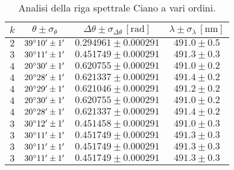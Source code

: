 \documentclass[]{article}
\begin{document}
    \begin{table}
        \centering
        \begin{tabular}{||c|c|c|c||}
            \hline
            $k$ & $\theta \pm \sigma_{\theta}$ & $\Delta\theta \pm \sigma_{\Delta\theta} \, \left[\text{rad}\right]$ & $\lambda \pm \sigma_{\lambda} \, \left[\text{nm}\right]$ \\\hline
            \hline
            $2$ & $39\degree 10' \pm 1'$ & $0.294961 \pm 0.000291$ & $491.0 \pm 0.5$ \\\hline
            $3$ & $30\degree 11' \pm 1'$ & $0.451749 \pm 0.000291$ & $491.3 \pm 0.3$ \\\hline
            $4$ & $20\degree 30' \pm 1'$ & $0.620755 \pm 0.000291$ & $491.0 \pm 0.2$ \\\hline
            $4$ & $20\degree 28' \pm 1'$ & $0.621337 \pm 0.000291$ & $491.4 \pm 0.2$ \\\hline
            $4$ & $20\degree 29' \pm 1'$ & $0.621046 \pm 0.000291$ & $491.2 \pm 0.2$ \\\hline
            $4$ & $20\degree 30' \pm 1'$ & $0.620755 \pm 0.000291$ & $491.0 \pm 0.2$ \\\hline
            $4$ & $20\degree 28' \pm 1'$ & $0.621337 \pm 0.000291$ & $491.4 \pm 0.2$ \\\hline
            $3$ & $30\degree 12' \pm 1'$ & $0.451458 \pm 0.000291$ & $491.0 \pm 0.3$ \\\hline
            $3$ & $30\degree 11' \pm 1'$ & $0.451749 \pm 0.000291$ & $491.3 \pm 0.3$ \\\hline
            $3$ & $30\degree 11' \pm 1'$ & $0.451749 \pm 0.000291$ & $491.3 \pm 0.3$ \\\hline
            $3$ & $30\degree 11' \pm 1'$ & $0.451749 \pm 0.000291$ & $491.3 \pm 0.3$ \\\hline
        \end{tabular}
        \label{ciano}
        \caption{Analisi della riga spettrale Ciano a vari ordini.}
    \end{table}
\end{document}
